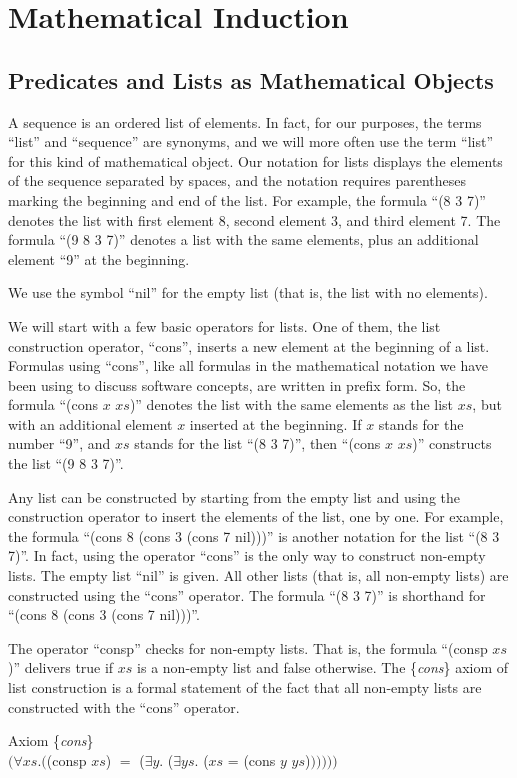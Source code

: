\chapter{Mathematical Induction}

\section{Predicates and Lists as Mathematical Objects}
\label{sec:lists-as-obj}
A sequence is an ordered list of elements. 
In fact, for our purposes, the terms ``list'' and ``sequence'' are synonyms,
and we will more often use the term ``list'' for this kind of mathematical object.
Our notation for lists displays the elements of the sequence separated by spaces,
and the notation requires parentheses marking the beginning and end of the list. 
For example, the formula ``(8 3 7)'' denotes the list with first element 8, 
second element 3, and third element 7. 
The formula ``(9 8 3 7)'' denotes a list with the same elements, 
plus an additional element ``9'' at the beginning. 

\label{nil-def}
We use the symbol ``nil'' for the empty list (that is, the list with no elements).

We will start with a few basic operators for lists. 
One of them, the list construction operator, ``cons'', 
inserts a new element at the beginning of a list. 
Formulas using ``cons'', like all formulas in 
the mathematical notation we have been using to discuss software concepts, 
are written in prefix form. 
So, the formula ``(cons $x$ $xs$)'' denotes the list 
with the same elements as the list $xs$, 
but with an additional element $x$ inserted at the beginning. 
If $x$ stands for the number ``9'', 
and $xs$ stands for the list ``(8 3 7)'', 
then ``(cons $x$ $xs$)'' constructs the list ``(9 8 3 7)''.

Any list can be constructed by starting from the empty list 
and using the construction operator to insert the elements of the list, one by one. 
For example, the formula ``(cons 8 (cons 3 (cons 7 nil)))'' 
is another notation for the list ``(8 3 7)''. 
In fact, using the operator ``cons'' is the only way to construct non-empty lists. 
The empty list ``nil'' is given. 
All other lists (that is, all non-empty lists) are constructed using the ``cons'' operator. 
The formula ``(8 3 7)'' is shorthand for ``(cons 8 (cons 3 (cons 7 nil)))''.

The operator ``consp'' checks for non-empty lists.
That is, the formula ``(consp $xs$)'' delivers true 
if $xs$ is a non-empty list and false otherwise. 
The \{\emph{cons}\} axiom of list construction is a 
formal statement of the fact that all non-empty lists 
are constructed with the ``cons'' operator.
\label{cons-axiom-formal}
\begin{center}
Axiom \{\emph{cons}\} \\
$(\forall xs.($(consp $xs$) $=$ ($\exists y.$ ($\exists ys.$ ($xs$ = (cons $y$ $ys$)$)))))$
\end{center}

